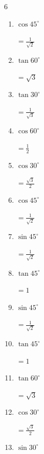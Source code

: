 \begin{multicols}{6}
\begin{enumerate}
        $\displaystyle =\sqrt{3}$

  \item $\displaystyle \cos{45^\circ}$

        $\displaystyle =\frac{1}{\sqrt{2}}$

  \item $\displaystyle \tan{60^\circ}$

        $\displaystyle =\sqrt{3}$

  \item $\displaystyle \tan{30^\circ}$

        $\displaystyle =\frac{1}{\sqrt{3}}$

\columnbreak %

  \item $\displaystyle \cos{60^\circ}$

        $\displaystyle =\frac{1}{2}$

  \item $\displaystyle \cos{30^\circ}$

        $\displaystyle =\frac{\sqrt{3}}{2}$

  \item $\displaystyle \cos{45^\circ}$

        $\displaystyle =\frac{1}{\sqrt{2}}$

  \item $\displaystyle \sin{45^\circ}$

        $\displaystyle =\frac{1}{\sqrt{2}}$

  \item $\displaystyle \tan{45^\circ}$

        $\displaystyle =1$

  \item $\displaystyle \sin{45^\circ}$

        $\displaystyle =\frac{1}{\sqrt{2}}$

  \item $\displaystyle \tan{45^\circ}$

        $\displaystyle =1$

  \item $\displaystyle \tan{60^\circ}$

        $\displaystyle =\sqrt{3}$

  \item $\displaystyle \cos{30^\circ}$

        $\displaystyle =\frac{\sqrt{3}}{2}$

  \item $\displaystyle \sin{30^\circ}$


\end{enumerate}
\end{multicols}
